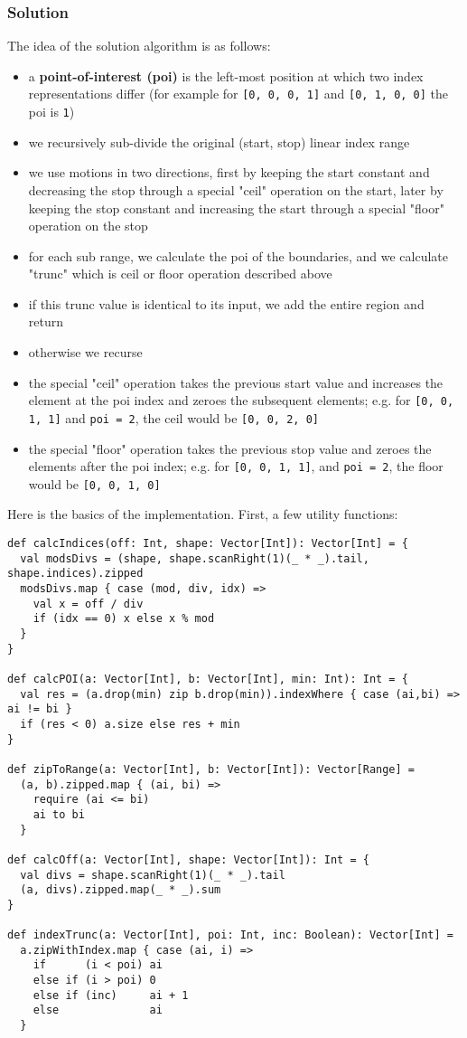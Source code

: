 \documentclass[11pt,a4paper]{article}
\begin{document}
\subsubsection*{Solution}

The idea of the solution algorithm is as follows:

\begin{itemize}
\item a \textbf{point-of-interest (poi)} is the left-most position
  at which two index representations differ
  (for example for \Verb![0, 0, 0, 1]! and \Verb![0, 1, 0, 0]! the poi is \Verb!1!)
\item we recursively sub-divide the original (start, stop) linear index range
\item we use motions in two directions, first by keeping the start constant
  and decreasing the stop through a special "ceil" operation on the start,
  later by keeping the stop constant and increasing the start through
  a special "floor" operation on the stop
\item for each sub range, we calculate the poi of the boundaries, and
  we calculate "trunc" which is ceil or floor operation described above
\item if this trunc value is identical to its input, we add the entire region
  and return
\item otherwise we recurse
\item the special "ceil" operation takes the previous start value and
  increases the element at the poi index and zeroes the subsequent elements;
  e.g. for \Verb![0, 0, 1, 1]! and \Verb!poi = 2!, the ceil would be \Verb![0, 0, 2, 0]!
\item the special "floor" operation takes the previous stop value and
  zeroes the elements after the poi index;
  e.g. for \Verb![0, 0, 1, 1]!, and \Verb!poi = 2!, the floor would be \Verb![0, 0, 1, 0]!
\end{itemize}
%
Here is the basics of the implementation. First, a few utility functions:
%
\begin{lstlisting}[style=scala]
def calcIndices(off: Int, shape: Vector[Int]): Vector[Int] = {
  val modsDivs = (shape, shape.scanRight(1)(_ * _).tail, shape.indices).zipped
  modsDivs.map { case (mod, div, idx) =>
    val x = off / div
    if (idx == 0) x else x % mod
  }
}

def calcPOI(a: Vector[Int], b: Vector[Int], min: Int): Int = {
  val res = (a.drop(min) zip b.drop(min)).indexWhere { case (ai,bi) => ai != bi }
  if (res < 0) a.size else res + min
}

def zipToRange(a: Vector[Int], b: Vector[Int]): Vector[Range] =
  (a, b).zipped.map { (ai, bi) =>
    require (ai <= bi)
    ai to bi
  }
  
def calcOff(a: Vector[Int], shape: Vector[Int]): Int = {
  val divs = shape.scanRight(1)(_ * _).tail
  (a, divs).zipped.map(_ * _).sum
}

def indexTrunc(a: Vector[Int], poi: Int, inc: Boolean): Vector[Int] =
  a.zipWithIndex.map { case (ai, i) =>
    if      (i < poi) ai
    else if (i > poi) 0
    else if (inc)     ai + 1
    else              ai
  }
\end{lstlisting}
\end{document}
